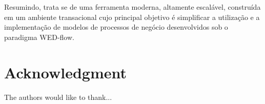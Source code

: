 \documentclass[conference]{IEEEtran}
\begin{document}
\par Resumindo, trata se de uma ferramenta moderna, altamente escalável, construída em um ambiente transacional cujo
principal objetivo é simplificar a utilização e a implementação de modelos de processos de negócio desenvolvidos sob
o paradigma WED-flow.



%



\section*{Acknowledgment}


The authors would like to thank...


\ifCLASSOPTIONcaptionsoff
  \newpage
\fi



\end{document}
